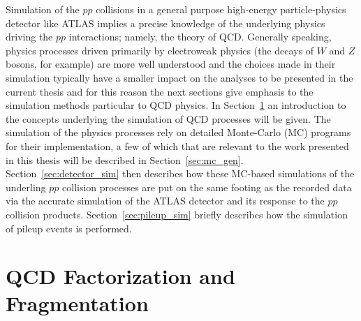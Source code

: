 Simulation of the $pp$ collisions in a general purpose high-energy particle-physics detector
like ATLAS implies a precise knowledge of the underlying physics driving the $pp$ interactions; namely,
the theory of QCD.
Generally speaking, physics processes driven primarily by electroweak physics (the decays of $W$ and $Z$ bosons, for example)
are more well understood and the choices made in their simulation typically have a smaller impact
on the analyses to be presented in the current thesis and for this reason the next sections give
emphasis to
the simulation methods particular to QCD physics.
In Section~\ref{sec:fact_frag} an introduction to the concepts underlying the simulation of QCD
processes will be given.
The simulation of the physics processes rely on detailed Monte-Carlo (MC) programs for their implementation,
a few of which that are relevant to the work presented in this thesis will be described in Section~\ref{sec:mc_gen}.
Section~\ref{sec:detector_sim} then describes how these MC-based simulations of the underling $pp$ collision processes
are put on the same footing as the recorded data via the accurate simulation of the ATLAS
detector and its response to the $pp$ collision products.
Section~\ref{sec:pileup_sim} briefly describes how the simulation of pileup events is performed.

\section{QCD Factorization and Fragmentation}
\label{sec:fact_frag}

